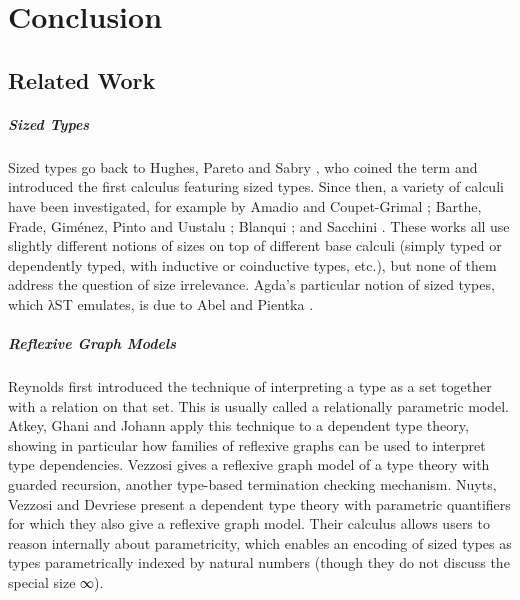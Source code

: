 \chapter{Conclusion}
\label{sec:conclusion}

\section{Related Work}
\label{sec:conclusion:related}

\paragraph{Sized Types} Sized types go back to Hughes, Pareto and Sabry
\cite{hughes1996}, who coined the term and introduced the first calculus
featuring sized types. Since then, a variety of calculi have been investigated,
for example by Amadio and Coupet-Grimal \cite{amadio1998}; Barthe, Frade,
Giménez, Pinto and Uustalu \cite{barthe2004}; Blanqui \cite{blanqui2004}; and
Sacchini \cite{sacchiniphd, sacchini2013}. These works all use slightly
different notions of sizes on top of different base calculi (simply typed or
dependently typed, with inductive or coinductive types, etc.), but none of them
address the question of size irrelevance. Agda's particular notion of sized
types, which λST emulates, is due to Abel and Pientka \cite{abel2016}.

\paragraph{Reflexive Graph Models} Reynolds \cite{reynolds1983} first
introduced the technique of interpreting a type as a set together with a
relation on that set. This is usually called a relationally parametric model.
Atkey, Ghani and Johann \cite{atkey2014} apply this technique to a dependent
type theory, showing in particular how families of reflexive graphs can be used
to interpret type dependencies. Vezzosi \cite{vezzosi2015} gives a reflexive
graph model of a type theory with guarded recursion, another type-based
termination checking mechanism. Nuyts, Vezzosi and Devriese \cite{nuyts2017}
present a dependent type theory with parametric quantifiers for which they also
give a reflexive graph model. Their calculus allows users to reason internally
about parametricity, which enables an encoding of sized types as types
parametrically indexed by natural numbers (though they do not discuss the
special size ∞).


